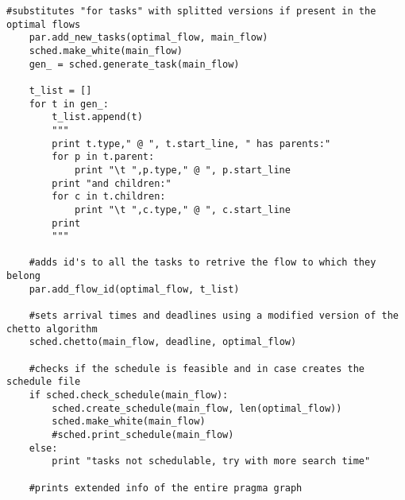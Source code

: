 \documentclass[a4paper,11pt,twoside]{book}
\begin{document}
\begin{lstlisting}[language=CCC, caption=graphCreator.py]
	#substitutes "for tasks" with splitted versions if present in the optimal flows
	par.add_new_tasks(optimal_flow, main_flow)
	sched.make_white(main_flow)
	gen_ = sched.generate_task(main_flow)

	t_list = []
	for t in gen_:
		t_list.append(t)
		"""
		print t.type," @ ", t.start_line, " has parents:"
		for p in t.parent:
			print "\t ",p.type," @ ", p.start_line
		print "and children:"
		for c in t.children:
			print "\t ",c.type," @ ", c.start_line
		print
		"""

	#adds id's to all the tasks to retrive the flow to which they belong
	par.add_flow_id(optimal_flow, t_list)

	#sets arrival times and deadlines using a modified version of the chetto algorithm
	sched.chetto(main_flow, deadline, optimal_flow)

	#checks if the schedule is feasible and in case creates the schedule file
	if sched.check_schedule(main_flow):
		sched.create_schedule(main_flow, len(optimal_flow))
		sched.make_white(main_flow)
		#sched.print_schedule(main_flow)
	else:
		print "tasks not schedulable, try with more search time"

	#prints extended info of the entire pragma graph
\end{lstlisting}
\end{document}
